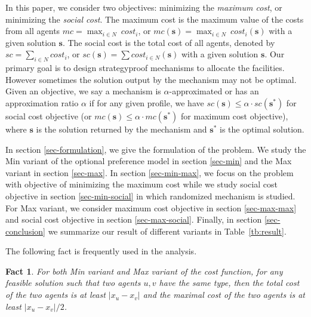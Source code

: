 \documentclass[twoside,11pt]{article}
\newtheorem{fact}{Fact}
\newcommand{\bd}{\mathbf}
\begin{document}
\indent In this paper, we consider two objectives: minimizing the \emph{maximum cost}, or minimizing the \emph{social cost}.
The maximum cost is the maximum value of the costs from all agents $mc = \max_{i \in N}~cost_i$, or $mc (\bd{s}) = \max_{i \in N}~cost_i(\bd{s})$ with a given solution $\bd{s}$.
The social cost is the total cost of all agents, denoted by $sc = \sum_{i \in N} cost_i$, or $sc (\bd{s}) = \sum cost_{i \in N}(\bd{s})$ with a given solution $\bd{s}$.
Our primary goal is to design strategyproof mechanisms to allocate the facilities. However sometimes the solution output by the mechanism may not be optimal.
Given an objective, we say a mechanism is $\alpha$-approximated or has an approximation ratio $\alpha$ if for any given profile,
we have $sc (\bd{s}) \leq \alpha \cdot sc (\bd{s}^*)$ for social cost objective (or $mc (\bd{s}) \leq \alpha \cdot mc (\bd{s}^*)$ for maximum cost objective), where $\bd{s}$ is the solution returned by the mechanism and $\bd{s}^*$ is the optimal solution.


In section \ref{sec-formulation}, we give the formulation of the problem.
We study the Min variant of the optional preference model in section \ref{sec-min} and the Max variant in section \ref{sec-max}.
In section \ref{sec-min-max}, we focus on the problem with objective of minimizing the maximum cost while we study social cost objective in section \ref{sec-min-social} in which randomized mechanism is studied.
For Max variant, we consider maximum cost objective in section \ref{sec-max-max} and social cost objective in section \ref{sec-max-social}.
%
Finally, in section \ref{sec-conclusion} we summarize our result of different variants in Table~\ref{tb:result}.
%

\noindent
The following fact is frequently used in the analysis.
\begin{fact}\label{fact-sametype}
For both Min variant and Max variant of the cost function,
for any feasible solution such that two agents $u,v$ have the same type,
then the total cost of the two agents is at least $|x_u-x_v|$ and
the maximal cost of the two agents is at least $|x_u-x_v|/2$.
\end{fact}



\end{document}
